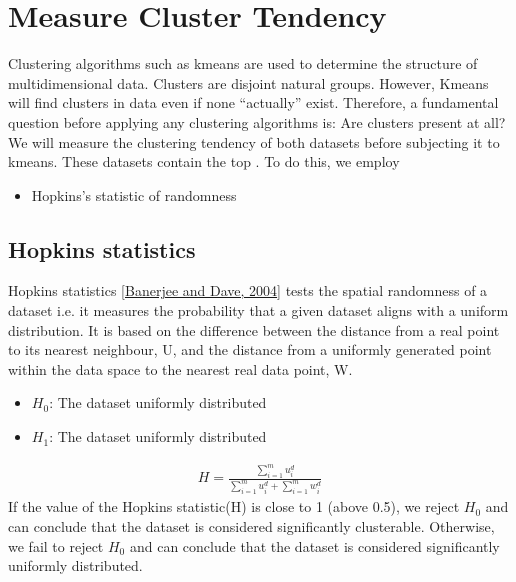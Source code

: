 \documentclass[letterpaper,10pt,english]{jupyterBook}
\begin{document}
\section{Measure Cluster Tendency}
\label{\detokenize{Clustering_Analysis:measure-cluster-tendency}}
\sphinxAtStartPar
Clustering algorithms such as k\sphinxhyphen{}means are used to determine the structure of multi\sphinxhyphen{}dimensional data. Clusters are disjoint natural groups. However, K\sphinxhyphen{}means will find clusters in data even if none “actually” exist. Therefore, a fundamental question before applying any clustering algorithms is: Are clusters present at all?
We will measure the clustering tendency of both datasets before subjecting it to k\sphinxhyphen{}means. These datasets contain the top . To do this, we employ
\begin{itemize}
\item {} 
\sphinxAtStartPar
Hopkins’s statistic  of randomness

\end{itemize}


\subsection{Hopkins statistics}
\label{\detokenize{Clustering_Analysis:hopkins-statistics}}
\sphinxAtStartPar
Hopkins statistics {[}\hyperlink{cite.References:id8}{Banerjee and Dave, 2004}{]} tests the spatial randomness of a dataset i.e. it measures the probability that a given dataset aligns with a uniform distribution. It is based on the difference between the distance from a real point to its nearest neighbour, U, and the distance from a uniformly generated point within the data space to the nearest real data point, W.
\begin{itemize}
\item {} 
\sphinxAtStartPar
\(H_{0}\): The dataset  uniformly distributed

\item {} 
\sphinxAtStartPar
\(H_{1}\): The dataset  uniformly distributed

\end{itemize}
\begin{equation*}
\begin{split}
H = \frac{\sum_{i=1}^{m} u_{i}^{d}}{\sum_{i=1}^{m} u_{i}^{d} + \sum_{i=1}^{m} w_{i}^{d}}
\end{split}
\end{equation*}
\sphinxAtStartPar
If the value of the Hopkins statistic(H) is close to 1 (above 0.5), we reject \(H_{0}\) and can conclude that the dataset is considered significantly clusterable.  Otherwise, we fail to reject \(H_{0}\) and can conclude that the dataset is considered significantly uniformly distributed.
\end{document}
